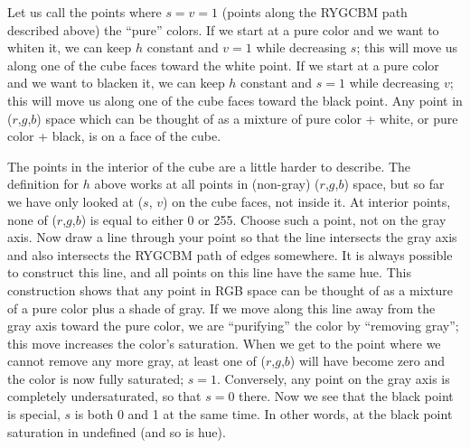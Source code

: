 Let us call the points where $s = v = 1$ (points along the RYGCBM path described above) the ``pure'' colors.  If we start at a pure color
and we want to whiten it, we can keep $h$ constant and $v = 1$
while decreasing $s$; this will move us along one of the cube
faces toward the white point.  If we start at a pure color and we want
to blacken it, we can keep $h$ constant and $s = 1$ while decreasing
$v$; this will move us along one of the cube faces toward the black
point.  Any point in ($r$,$g$,$b$) space which can be thought of as a
mixture of pure color + white, or pure color + black, is on a face of
the cube.

The points in the interior of the cube are a little harder to describe.
The definition for $h$ above works at all points in (non-gray)
($r$,$g$,$b$) space, but so far we have only looked at ($s$,
$v$) on the cube faces, not inside it.  At interior points, none
of ($r$,$g$,$b$) is equal to either 0 or 255.  Choose such a point,
not on the gray axis.  Now draw a line through your point so that the
line intersects the gray axis and also intersects the RYGCBM path of
edges somewhere.  It is always possible to construct this line, and
all points on this line have the same hue.  This construction shows
that any point in RGB space can be thought of as a mixture of a pure
color plus a shade of gray.  If we move along this line away from the
gray axis toward the pure color, we are ``purifying'' the color by
``removing gray''; this move increases the color's saturation.  When
we get to the point where we cannot remove any more gray, at least one
of ($r$,$g$,$b$) will have become zero and the color is now fully
saturated; $s = 1$.  Conversely, any point on the gray axis is
completely undersaturated, so that $s = 0$ there.  Now we see that
the black point is special, $s$ is both 0 and 1 at the same time. In other words, at the black point saturation in undefined (and so is hue).

